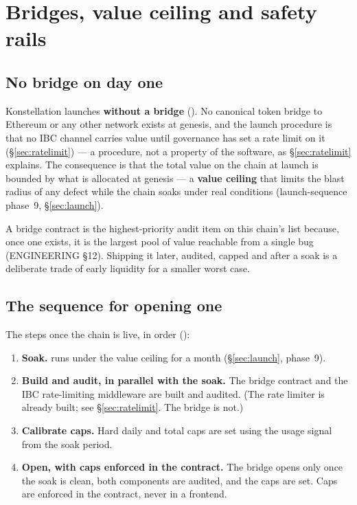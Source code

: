 \section{Bridges, value ceiling and safety rails}
\label{sec:bridges}

\subsection{No bridge on day one}

Konstellation launches \textbf{without a bridge} (). No canonical
token bridge to Ethereum or any other network exists at genesis, and the
launch procedure is that no IBC channel carries value until governance has set
a rate limit on it (\S\ref{sec:ratelimit}) --- a procedure, not a property of
the software, as \S\ref{sec:ratelimit} explains. The consequence is that the total value on the chain at
launch is bounded by what is allocated at genesis --- a \textbf{value ceiling}
that limits the blast radius of any defect while the chain soaks under real
conditions (launch-sequence phase~9, \S\ref{sec:launch}).

A bridge contract is the highest-priority audit item on this chain's list
because, once one exists, it is the largest pool of value reachable from a
single bug (ENGINEERING \S12). Shipping it later, audited, capped and after a soak is a
deliberate trade of early liquidity for a smaller worst case.

\subsection{The sequence for opening one}
\label{sec:bridgeseq}

The steps once the chain is live, in order ():

\begin{enumerate}
\item \textbf{Soak.}  runs under the value ceiling for a
  month (\S\ref{sec:launch}, phase~9).
\item \textbf{Build and audit, in parallel with the soak.} The bridge contract
  and the IBC rate-limiting middleware are built and audited. (The rate limiter
  is already built; see \S\ref{sec:ratelimit}. The bridge is not.)
\item \textbf{Calibrate caps.} Hard daily and total caps are set using the
  usage signal from the soak period.
\item \textbf{Open, with caps enforced in the contract.} The bridge opens only
  once the soak is clean, both components are audited, and the caps are set.
  Caps are enforced in the contract, never in a frontend.
\end{enumerate}


